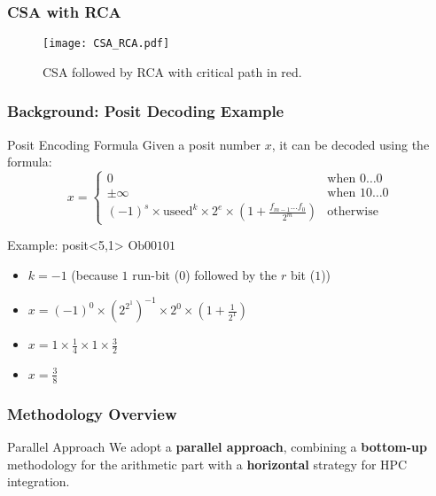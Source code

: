 \begin{frame}
    \frametitle{CSA with RCA}
    \begin{figure}[H]
        \centering
        \texttt{[image: CSA\_RCA.pdf]}
        \caption{CSA followed by RCA with critical path in red.}
    \end{figure}
\end{frame}



\begin{frame}
    \frametitle{Background: Posit Decoding Example}

            \begin{block}{Posit Encoding Formula}
                Given a posit number \( x \), it can be decoded using the formula:
                \[
                x =
                \begin{cases}
                0 & \text{when } 0\ldots0 \\
                \pm\infty & \text{when } 10\ldots0 \\
                (-1)^s \times \text{useed}^k \times 2^e \times \left(1 + \frac{f_{m-1}\ldots f_0}{2^m}\right) & \text{otherwise}
                \end{cases}
                \]
            \end{block}

            \begin{block}{Example: posit<5,1> \( \text{Ob00101} \)}
                \begin{itemize}
                    \item \( k = -1 \) (because \( 1 \) run-bit (\( 0 \)) followed by the \( r \) bit (\( 1 \)))
                    \item \( x = (-1)^0 \times (2^{2^1})^{-1} \times 2^0 \times \left( 1 + \frac{1}{2^1} \right) \)
                    \item \( x = 1 \times \frac{1}{4} \times 1 \times \frac{3}{2} \)
                    \item \( x = \frac{3}{8} \)
                \end{itemize}
            \end{block}
\end{frame}



\begin{frame}
    \frametitle{Methodology Overview}

        \begin{block}{Parallel Approach}
		We adopt a \textbf{parallel approach}, combining a \textbf{bottom-up} methodology for the arithmetic part with a \textbf{horizontal} strategy for HPC integration.
        \end{block}

\end{frame}

